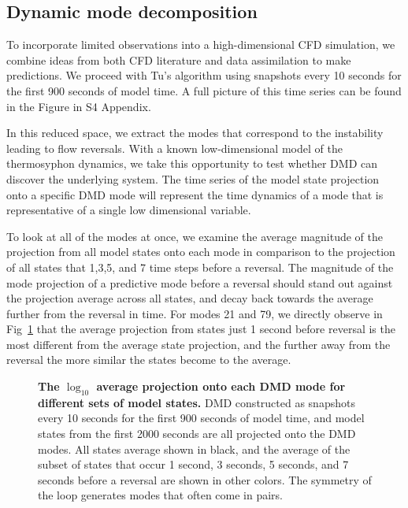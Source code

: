 \documentclass[10pt,letterpaper]{article}
\begin{document}
\subsection*{Dynamic mode decomposition}
\label{dmd_section}

To incorporate limited observations into a high-dimensional CFD simulation, we combine ideas from both CFD literature and data assimilation to make predictions.
We proceed with Tu's algorithm using snapshots every 10 seconds for the first 900 seconds of model time.
A full picture of this time series can be found in the Figure in S4 Appendix.

In this reduced space, we extract the modes that correspond to the instability leading to flow reversals.
With a known low-dimensional model of the thermosyphon dynamics, we take this opportunity to test whether DMD can discover the underlying system.
The time series of the model state projection onto a specific DMD mode will represent the time dynamics of a mode that is representative of a single low dimensional variable.

To look at all of the modes at once, we examine the average magnitude of the projection from all model states onto each mode in comparison to the projection of all states that 1,3,5, and 7 time steps before a reversal.
The magnitude of the mode projection of a predictive mode before a reversal should stand out against the projection average across all states, and decay back towards the average further from the reversal in time.
For modes 21 and 79, we directly observe in Fig~\ref{fig:DMD_modes} that the average projection from states just 1 second before reversal is the most different from the average state projection, and the further away from the reversal the more similar the states become to the average.

\begin{figure}[h]
  \centering
  \caption[]{
\textbf{    The $\log_{10}$ average projection onto each DMD mode for different sets of model states.
}    DMD constructed as snapshots every 10 seconds for the first 900 seconds of model time, and model states from the first 2000 seconds are all projected onto the DMD modes.
    All states average shown in black, and the average of the subset of states that occur 1 second, 3 seconds, 5 seconds, and 7 seconds before a reversal are shown in other colors.
    The symmetry of the loop generates modes that often come in pairs.
      }
  \label{fig:DMD_modes}
\end{figure}
\end{document}
